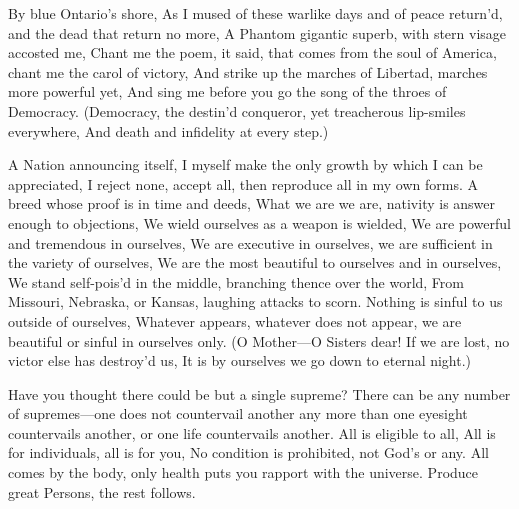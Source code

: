 \documentclass[11pt]{book}
\newenvironment {poem} [1]
 {\titulus{#1}%
  \versus
  \Nstanza{0}%
  \numerus{1}}
 {\endversus}
\begin{document}
\begin{poem}{By Blue Ontario's Shore}

  \Modus  \excessus {\justified[850]}
  \Facies \strophae {\Snumber}

\stropha %

By blue Ontario's shore,
As I mused of these warlike days and of peace return'd, and the %
    dead that return no more,
A Phantom gigantic superb, with stern visage accosted me,
{\Facies* \textus {\itshape}
Chant me the poem, \textup{it said}, that comes from the soul of Ameri\-ca, %
    chant me the carol of victory,
And strike up the marches of Libertad, marches more powerful yet,
And sing me before you go the song of the throes of Democracy.
}
     \vacua
(Democracy, the destin'd conqueror, yet treacherous lip-smiles everywhere,
And death and infidelity at every step.)

\stropha %

A Nation announcing itself,
I myself make the only growth by which I can be appreciated,
I reject none, accept all, then reproduce all in my own forms.
     \vacua
A breed whose proof is in time and deeds,
What we are we are, nativity is answer enough to objections,
We wield ourselves as a weapon is wielded,
We are powerful and tremendous in ourselves,
We are executive in ourselves, we are sufficient in the variety of %
    ourselves,
We are the most beautiful to ourselves and in ourselves,
We stand self-pois'd in the middle, branching thence over the world,
From Missouri, Nebraska, or Kansas, laughing attacks to scorn.
     \vacua
Nothing is sinful to us outside of ourselves,
Whatever appears, whatever does not appear, we are beautiful or %
    sinful in ourselves only.
     \vacua
(O Mother---O Sisters dear!
If we are lost, no victor else has destroy'd us,
It is by ourselves we go down to eternal night.)

\stropha %

Have you thought there could be but a single supreme?
There can be any number of supremes---one does not countervail %
    another any more than one eyesight countervails another, or %
    one life countervails another.
     \vacua
All is eligible to all,
All is for individuals, all is for you,
No condition is prohibited, not God's or any.
     \vacua
All comes by the body, only health puts you rapport with the universe.
     \vacua
Produce great Persons, the rest follows.

\stropha %


\end{poem}
\end{document}
